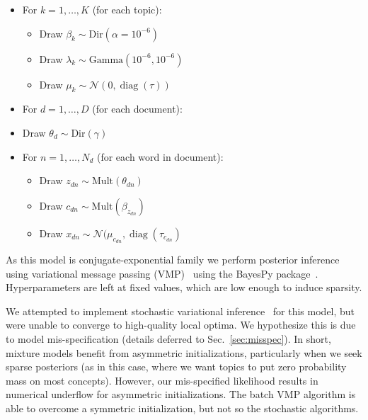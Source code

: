 \documentclass[11pt]{article}
\DeclareMathOperator{\diag}{diag}
\begin{document}
\begin{itemize}
\item For $k = 1, \ldots, K$ (for each topic):
  \begin{itemize}
    \item Draw $\beta_k \sim \mbox{Dir}(\alpha=10^{-6})$
    \item Draw $\lambda_k \sim \mbox{Gamma}(10^{-6}, 10^{-6})$
    \item Draw $\mu_k \sim \mathcal{N}(0, \diag(\tau))$
  \end{itemize}
\item For $d = 1, \ldots, D$ (for each document):
  \item Draw $\theta_d \sim \mbox{Dir}(\gamma)$
  \item For $n = 1, \ldots, N_d$ (for each word in document):
  \begin{itemize}
    \item Draw $z_{dn} \sim \mbox{Mult}(\theta_{dn})$
    \item Draw $c_{dn} \sim \mbox{Mult}(\beta_{z_{dn}})$
    \item Draw $x_{dn} \sim \mathcal{N}(\mu_{c_{dn}}, \diag(\tau_{c_{dn}})$
  \end{itemize}
\end{itemize}

As this model is conjugate-exponential family we perform posterior inference using variational message passing (VMP)~\cite{Winn05} using the BayesPy package~\cite{Luttinen14}. Hyperparameters are left at fixed values, which are low enough to induce sparsity.

We attempted to implement stochastic variational inference~\cite{Hoffman13} for this model, but were unable to converge to high-quality local optima. We hypothesize this is due to model mis-specification (details deferred to Sec.~\ref{sec:misspec}). In short, mixture models benefit from asymmetric initializations, particularly when we seek sparse posteriors (as in this case, where we want topics to put zero probability mass on most concepts). However, our mis-specified likelihood results in numerical underflow for asymmetric initializations. The batch VMP algorithm is able to overcome a symmetric initialization, but not so the stochastic algorithms.
\end{document}
